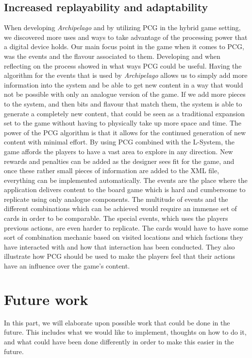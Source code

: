 \subsection{Increased replayability and adaptability}
When developing \textit{Archipelago} and by utilizing PCG in the hybrid game setting, we discovered more uses and ways to take advantage of the processing power that a digital device holds. Our main focus point in the game when it comes to PCG, was the events and the flavour associated to them. Developing and when reflecting on the process showed in what ways PCG could be useful. Having the algorithm for the events that is used by \textit{Archipelago} allows us to simply add more information into the system and be able to get new content in a way that would not be possible with only an analogue version of the game. If we add more pieces to the system, and then bits and flavour that match them, the system is able to generate a completely new content, that could be seen as a traditional expansion set to the game without having to physically take up more space and time. The power of the PCG algorithm is that it allows for the continued generation of new content with minimal effort. By using PCG combined with the L-System, the game affords the players to have a vast area to explore in any direction. New rewards and penalties can be added as the designer sees fit for the game, and once these rather small pieces of information are added to the XML file, everything can be implemented automatically. The events are the place where the application delivers content to the board game which is hard and cumbersome to replicate using only analogue components. The multitude of events and the different combinations which can be achieved would require an immense set of cards in order to be comparable. 
The special events, which uses the players previous actions, are even harder to replicate. The cards would have to have some sort of combination mechanic based on visited locations and which factions they have interacted with and how that interaction has been conducted. They also illustrate how PCG should be used to make the players feel that their actions have an influence over the game's content.

\section{Future work}
\label{sec:future}
In this part, we will elaborate upon possible work that could be done in the future. This includes what we would like to implement, thoughts on how to do it, and what could have been done differently in order to make this easier in the future.

